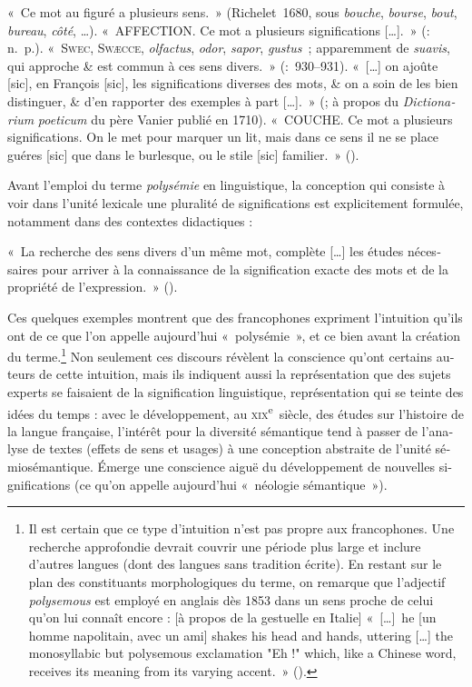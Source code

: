 \documentclass[output=paper]{langsci/langscibook}
\begin{document}
\begin{otherlanguage}{french}
\ea  «~Ce mot au figuré a plusieurs sens.~» (Richelet~1680, sous \textit{bouche}, \textit{bourse}, \textit{bout}, \textit{bureau}, \textit{côté}, …).
\ex «~AFFECTION. Ce mot a plusieurs significations […].~» (\citealt{regis_cours_1691}: n.~p.).
\ex  «~S\textsc{wec,} \textsc{Swæcce,} \textit{olfactus}, \textit{odor}, \textit{sapor}, \textit{gustus~}; apparemment de \textit{suavis}, qui approche \& est commun à ces sens divers.~» (\citealt[930--931]{thomassin_methode_1690}:~930--931).
\ex «~[…] on ajoûte [sic], en François [sic], les significations diverses des mots, \& on a soin de les bien distinguer, \& d’en rapporter des exemples à part […].~» (\citealt[172]{leclerc_bibliotheque_1715}; à propos du \textit{Dictionarium} \textit{poeticum} du père Vanier publié en 1710).
\ex «~COUCHE. Ce mot a plusieurs significations. On le met pour marquer un lit, mais dans ce sens il ne se place guéres [sic] que dans le burlesque, ou le stile [sic] familier.~» (\citealt[167]{le_roux_dictionaire_1735}).
\z

Avant l’emploi du terme \textit{polysémie} en linguistique, la conception qui consiste à voir dans l’unité lexicale une pluralité de significations est explicitement formulée, notamment dans des contextes didactiques :

\ea «~La recherche des sens divers d’un même mot, complète […] les études nécessaires pour arriver à la connaissance de la signification exacte des mots et de la propriété de l’expression.~» (\citealt[252]{michel_etudes_1858}).
\z

Ces quelques exemples montrent que des francophones expriment l’intuition qu’ils ont de ce que l’on appelle aujourd’hui «~polysémie~», et ce bien avant la création du terme.\footnote{Il est certain que ce type d’intuition n’est pas propre aux francophones. Une recherche approfondie devrait couvrir une période plus large et inclure d’autres langues (dont des langues sans tradition écrite). En restant sur le plan des constituants morphologiques du terme, on remarque que l’adjectif \textit{polysemous} est employé en anglais dès 1853 dans un sens proche de celui qu’on lui connaît encore : [à propos de la gestuelle en Italie] «~[…]~he [un homme napolitain, avec un ami] shakes his head and hands, uttering […] the monosyllabic but polysemous exclamation "Eh !" which, like a Chinese word, receives its meaning from its varying accent.~» (\citealt[534]{wiseman_essays_1853}).} Non seulement ces discours révèlent la conscience qu’ont certains auteurs de cette intuition, mais ils indiquent aussi la représentation que des sujets experts se faisaient de la signification linguistique, représentation qui se teinte des idées du temps : avec le développement, au \textsc{xix}\textsuperscript{e}~siècle, des études sur l’histoire de la langue française, l’intérêt pour la diversité sémantique tend à passer de l’analyse de textes (effets de sens et usages) à une conception abstraite de l’unité sémiosémantique. Émerge une conscience aiguë du développement de nouvelles significations (ce qu’on appelle aujourd’hui «~néologie sémantique~»).


\end{otherlanguage}
\end{document}
